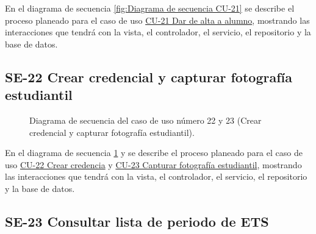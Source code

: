 En el diagrama de secuencia \ref{fig:Diagrama de secuencia CU-21} se describe el proceso planeado para el caso de uso \hyperlink{CU-21}{CU-21 Dar de alta a alumno}, mostrando las interacciones que tendrá con la vista, el controlador, el servicio, el repositorio y la base de datos.

\newpage

\subsection{SE-22 Crear credencial y capturar fotografía estudiantil}

\begin{figure}[htbp!]
	\begin{center}
		\caption{Diagrama de secuencia del caso de uso número 22 y 23 (Crear credencial y capturar fotografía estudiantil).}
		\label{fig:Diagrama de secuencia CU-22 y CU23}
	\end{center}
\end{figure}

En el diagrama de secuencia \ref{fig:Diagrama de secuencia CU-22 y CU23} y se describe el proceso planeado para el caso de uso \hyperlink{CU-22}{CU-22 Crear credencia} y \hyperlink{CU-23}{CU-23 Capturar fotografía estudiantil}, mostrando las interacciones que tendrá con la vista, el controlador, el servicio, el repositorio y la base de datos.

\newpage

\subsection{SE-23 Consultar lista de periodo de ETS}

